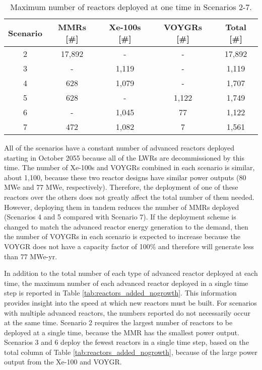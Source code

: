 \begin{table}
    \centering 
    \caption{Maximum number of reactors deployed at one time in 
    Scenarios 2-7.}
    \label{tab:reactors_nogrowth}
    \begin{tabular}{c c c c c}
        \hline
        Scenario & \glspl{MMR} [\#] & Xe-100s [\#] & VOYGRs [\#] 
        & Total [\#]\\\hline
        2 & 17,892 & - & - & 17,892\\
        3 & - & 1,119 & - & 1,119\\
        4 & 628 & 1,079 & - & 1,707\\
        5 & 628 & - & 1,122 & 1,749\\
        6 & - & 1,045 & 77 & 1,122\\
        7 & 472 & 1,082 & 7 & 1,561\\
        \hline
    \end{tabular}
\end{table}

All of the scenarios have a constant number of advanced reactors 
deployed starting in October 2055 because all of the \glspl{LWR} are 
decommissioned by this time. The number of Xe-100s and VOYGRs combined 
in each scenario is similar, about 1,100, because these two reactor 
designs have similar power outputs (80 MWe and 77 MWe, respectively). 
Therefore, the deployment of one of these reactors over the others does 
not greatly affect the total number of them needed. However, 
deploying them in tandem reduces the number of \glspl{MMR} deployed
(Scenarios 4 and 5 compared with Scenario 7). If the deployment scheme 
is changed to match the advanced reactor energy generation to the demand, 
then the number of VOYGRs in each scenario is expected to increase because 
the VOYGR does not have a capacity factor of 100\% and therefore will 
generate less than 77 MWe-yr. 

In addition to the total number of each type of advanced reactor deployed 
at each time, the maximum number of each advanced reactor deployed in a 
single time step is reported in Table 
\ref{tab:reactors_added_nogrowth}. This information provides insight 
into the speed at which new reactors must be built. For scenarios with 
multiple advanced reactors, the numbers reported do not necessarily occur 
at the same time. Scenario 2 requires 
the largest number of reactors to be deployed at a single time, because 
the \gls{MMR} has the smallest power output. Scenarios 3 and 
6 deploy the fewest reactors in 
a single time step, based on the total column of Table 
\ref{tab:reactors_added_nogrowth}, because of the large power output from 
the Xe-100 and VOYGR. 

